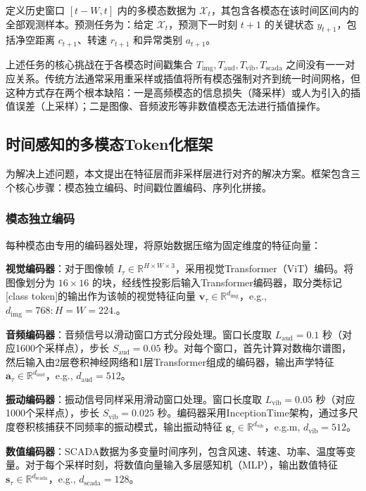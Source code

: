 \documentclass[12pt,a4paper]{article}
\begin{document}
定义历史窗口 \([t-W, t]\) 内的多模态数据为 \(\mathcal{X}_t\)，其包含各模态在该时间区间内的全部观测样本。预测任务为：给定 \(\mathcal{X}_t\)，预测下一时刻 \(t+1\) 的关键状态 \(y_{t+1}\)，包括净空距离 \(c_{t+1}\)、转速 \(r_{t+1}\) 和异常类别 \(a_{t+1}\)。

上述任务的核心挑战在于各模态时间戳集合 \(T_{\text{img}}, T_{\text{aud}}, T_{\text{vib}}, T_{\text{scada}}\) 之间没有一一对应关系。传统方法通常采用重采样或插值将所有模态强制对齐到统一时间网格，但这种方式存在两个根本缺陷：一是高频模态的信息损失（降采样）或人为引入的插值误差（上采样）；二是图像、音频波形等非数值模态无法进行插值操作。

\subsection{时间感知的多模态Token化框架}

为解决上述问题，本文提出在特征层而非采样层进行对齐的解决方案。框架包含三个核心步骤：模态独立编码、时间戳位置编码、序列化拼接。

\subsubsection{模态独立编码}

每种模态由专用的编码器处理，将原始数据压缩为固定维度的特征向量：

\textbf{视觉编码器}：对于图像帧 \(I_{\tau} \in \mathbb{R}^{H \times W \times 3}\)，采用视觉Transformer（ViT）编码\cite{dosovitskiy2021image}。将图像划分为 \(16 \times 16\) 的块，经线性投影后输入Transformer编码器，取分类标记[class token]的输出作为该帧的视觉特征向量 \(\mathbf{v}_{\tau} \in \mathbb{R}^{d_{\text{img}}}\)，e.g., \(d_{\text{img}} = 768: H=W=224.\)。

\textbf{音频编码器}：音频信号以滑动窗口方式分段处理。窗口长度取 \(L_{\text{aud}} = 0.1\) 秒（对应1600个采样点），步长 \(S_{\text{aud}} = 0.05\) 秒。对每个窗口，首先计算对数梅尔谱图，然后输入由2层卷积神经网络和1层Transformer组成的编码器，输出声学特征 \(\mathbf{a}_{\tau} \in \mathbb{R}^{d_{\text{aud}}}\)，e.g., \(d_{\text{aud}} = 512\)。

\textbf{振动编码器}：振动信号同样采用滑动窗口处理。窗口长度取 \(L_{\text{vib}} = 0.05\) 秒（对应1000个采样点），步长 \(S_{\text{vib}} = 0.025\) 秒。编码器采用InceptionTime架构\cite{fawaz2020inceptiontime}，通过多尺度卷积核捕获不同频率的振动模式，输出振动特征 \(\mathbf{g}_{\tau} \in \mathbb{R}^{d_{\text{vib}}}\)，e.g.m, \(d_{\text{vib}} = 512\)。

\textbf{数值编码器}：SCADA数据为多变量时间序列，包含风速、转速、功率、温度等变量。对于每个采样时刻，将数值向量输入多层感知机（MLP），输出数值特征 \(\mathbf{s}_{\tau} \in \mathbb{R}^{d_{\text{scada}}}\)，e.g., \(d_{\text{scada}} = 128\)。
\end{document}
